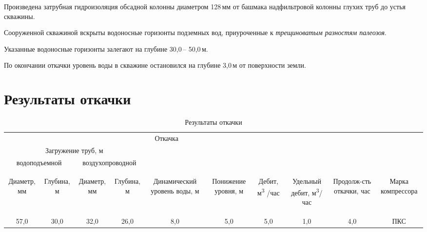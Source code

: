 \documentclass[a4paper,12pt]{article} %
\newcommand{\txtDepth}{50,0}					%
\newcommand{\txtDebit}{5,0}						%
\newcommand{\txtLevel}{3,0}						%
\newcommand{\txtHorizDepth}{30,0}				%
\newcommand{\txtGeology}{трещиноватым разностям палеозоя}
\newcommand{\txtTubeDiam}{128}					%
\newcommand{\txtPumpResults}{
57,0 & 		%
30,0 & 		%
32,0 & 		%
26,0 &		%
8,0  & 		%
5,0  &		%
\txtDebit & %
1,0  &		%
4,0  &		%
ПКС			%
}			%
\begin{document}
Произведена затрубная гидроизоляция обсадной колонны диаметром \txtTubeDiam \,мм от башмака надфильтровой колонны глухих труб до устья скважины.

Сооруженной скважиной вскрыты водоносные горизонты  подземных вод, приуроченные к \emph{\txtGeology}.

Указанные водоносные горизонты залегают на глубине   \txtHorizDepth \,– \txtDepth \,м.

По окончании откачки уровень воды в скважине остановился на глубине  \txtLevel \,м от поверхности земли.

\section*{Результаты откачки}

\begin{table}[!h]
	\caption{Результаты откачки}
	\centering\begin{tabular}{|c|c|c|c|c|c|c|c|c|c|}
	\hline 
	\multicolumn{8}{|c|}{Откачка}&  &  \\ 
	\cline{1-8} 
	\multicolumn{4}{|c|}{Загружение труб, м} &  &  &  &  &  &  \\ 
	\cline{1-4} 
	\multicolumn{2}{|c|}{водоподъемной} & \multicolumn{2}{c|}{воздухопроводной} &  &  &  &  &  & \\ 
	\cline{1-4} 
	\begin{sideways}Диаметр, мм\end{sideways} &
	\begin{sideways}Глубина, м\end{sideways} &
	\begin{sideways}Диаметр, мм\end{sideways} &
	\begin{sideways}Глубина, м\end{sideways} &
	\begin{sideways}Динамический уровень воды, м\end{sideways} &
	\begin{sideways}Понижение уровня, м\end{sideways} &
	\begin{sideways}Дебит, м\textsuperscript{3} /час\end{sideways} &
	\begin{sideways}Удельный дебит, м\textsuperscript{3}/час \end{sideways} &
	\begin{sideways}Продолж-сть откачки, час\end{sideways} &
	\begin{sideways}Марка компрессора\end{sideways} \\ 
	\hline 
	\txtPumpResults \\ 
	\hline 
\end{tabular} 
\end{table}
\end{document}
